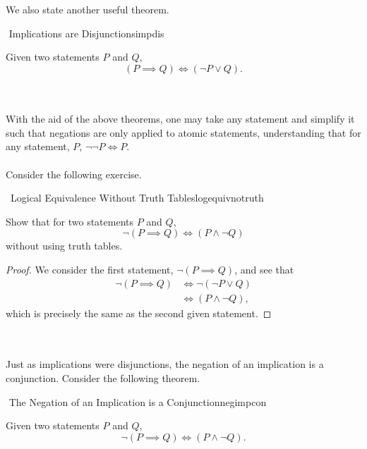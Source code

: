         \vphantom
        \\
        \\
        We also state another useful theorem.
        \begin{theorem}{\Stop\,\,Implications are Disjunctions}{impdis}
        
            Given two statements \(P\) and \(Q\),
            \begin{equation*}
                (P\implies Q)\iff(\neg P \vee Q).
            \end{equation*}
        
        \end{theorem}
        \pagebreak
        \vphantom
        \\
        \\
        With the aid of the above theorems, one may take any statement and simplify it such that negations are only applied to atomic statements, understanding that for any statement, \(P\), \(\neg\neg P\iff P\).
        \\
        \\
        Consider the following exercise.
        \begin{exercise}{\Difficulty\,\Difficulty\,\,Logical Equivalence Without Truth Tables}{logequivnotruth}
        
            Show that for two statements \(P\) and \(Q\),
            \begin{equation*}
                \neg(P\implies Q)\iff(P\wedge\neg Q)
            \end{equation*}
            without using truth tables.
            \begin{proof}
            We consider the first statement, \(\neg(P\implies Q)\), and see that
            \begin{align*}
                \neg(P\implies Q)&\iff\neg(\neg P\vee Q) \\
                &\iff(P \wedge \neg Q),
            \end{align*}
            which is precisely the same as the second given statement.
            \end{proof}
        
        \end{exercise}
        \vphantom
        \\
        \\
        Just as implications were disjunctions, the negation of an implication is a conjunction. Consider the following theorem.
        \begin{theorem}{\Stop\,\,The Negation of an Implication is a Conjunction}{negimpcon}
        
            Given two statements \(P\) and \(Q\),
            \begin{equation*}
                \neg(P\implies Q)\iff(P\wedge\neg Q).
            \end{equation*}
        
        \end{theorem}
